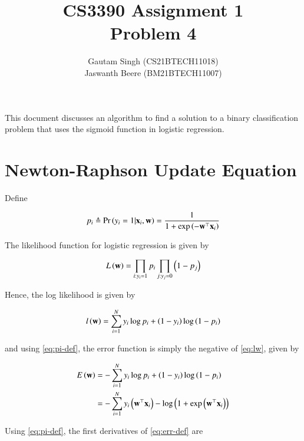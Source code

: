 \documentclass[journal,12pt,twocolumn]{IEEEtran}
\begin{document}
\vspace{3cm}
\title{CS3390 Assignment 1\\Problem 4}
\author{Gautam Singh (CS21BTECH11018)\\Jaswanth Beere (BM21BTECH11007)}
\maketitle
\tableofcontents
\bigskip

This document discusses an algorithm to find a solution to a binary
classification problem that uses the sigmoid function in logistic regression.

\section{Newton-Raphson Update Equation}

Define

\begin{equation}
     p_i \triangleq \Pr\left(y_i = 1|\boldsymbol{\mathbf{x}}_i, \boldsymbol{\mathbf{w}}\right) = \frac{1}{1 + \exp\left(-\boldsymbol{\mathbf{w}}^\top\boldsymbol{\mathbf{x}}_i\right)}
     \label{eq:pi-def}
\end{equation}

The likelihood function for logistic regression is given by

\begin{equation}
     L\left(\boldsymbol{\mathbf{w}}\right) = \prod_{i:y_i = 1}p_i\prod_{j:y_j = 0}\left(1-p_j\right)
     \label{eq:Lw}
\end{equation}

Hence, the log likelihood is given by

\begin{equation}
     l\left(\boldsymbol{\mathbf{w}}\right) = \sum_{i=1}^{N}y_i\log p_i + \left(1 - y_i\right)\log\left(1 - p_i\right)
     \label{eq:lw}
\end{equation}

and using \eqref{eq:pi-def}, the error function is simply the negative of
\eqref{eq:lw}, given by

\begin{align}
     E\left(\boldsymbol{\mathbf{w}}\right) &= -\sum_{i=1}^{N}y_i\log p_i + \left(1 - y_i\right)\log\left(1 - p_i\right) \\
                     &= -\sum_{i=1}^{N}y_i\left(\boldsymbol{\mathbf{w}}^\top\boldsymbol{\mathbf{x}}_i\right) - \log\left(1 + \exp\left(\boldsymbol{\mathbf{w}}^\top\boldsymbol{\mathbf{x}}_i\right)\right)
                     \label{eq:err-def}
\end{align}

Using \eqref{eq:pi-def}, the first derivatives of \eqref{eq:err-def} are
\end{document}

